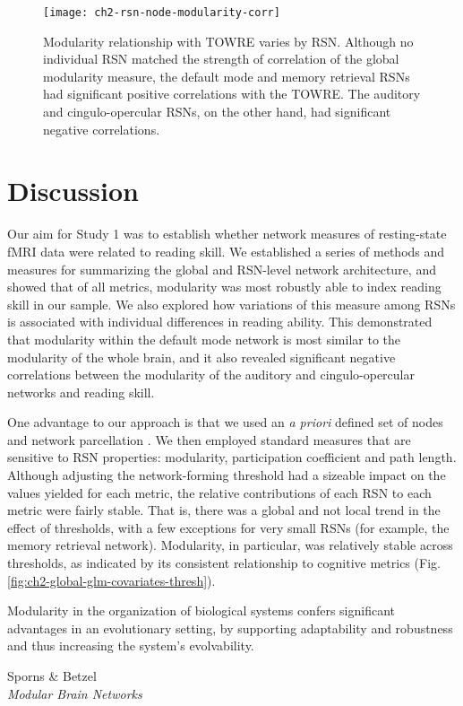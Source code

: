 \begin{figure}[t]
    \centering
    \texttt{[image: ch2-rsn-node-modularity-corr]}
    \caption[Modularity relationship with TOWRE varies by RSN.] {Modularity relationship with TOWRE varies by RSN. Although no individual RSN matched the strength of correlation of the global modularity measure, the default mode and memory retrieval RSNs had significant positive correlations with the TOWRE. The auditory and cingulo-opercular RSNs, on the other hand, had significant negative correlations.}
    \label{fig:ch2-rsn-node-modularity-corr}
\end{figure}

\section{Discussion}

Our aim for Study 1 was to establish whether network measures of resting-state fMRI data were related to reading skill. We established a series of methods and measures for summarizing the global and RSN-level network architecture, and showed that of all metrics, modularity was most robustly able to index reading skill in our sample. We also explored how variations of this measure among RSNs is associated with individual differences in reading ability. This demonstrated that modularity within the default mode network is most similar to the modularity of the whole brain, and it also revealed significant negative correlations between the modularity of the auditory and cingulo-opercular networks and reading skill.

One advantage to our approach is that we used an \textit{a priori} defined set of nodes and network parcellation \citep{Power2013}. We then employed standard measures that are sensitive to RSN properties: modularity, participation coefficient and path length. Although adjusting the network-forming threshold had a sizeable impact on the values yielded for each metric, the relative contributions of each RSN to each metric were fairly stable. That is, there was a global and not local trend in the effect of thresholds, with a few exceptions for very small RSNs (for example, the memory retrieval network). Modularity, in particular, was relatively stable across thresholds, as indicated by its consistent relationship to cognitive metrics (Fig. \ref{fig:ch2-global-glm-covariates-thresh}).

\epigraph{Modularity in the organization of biological systems confers significant advantages in an evolutionary setting, by supporting adaptability and robustness and thus increasing the system's evolvability.}{Sporns \& Betzel\\\textit{Modular Brain Networks}}

